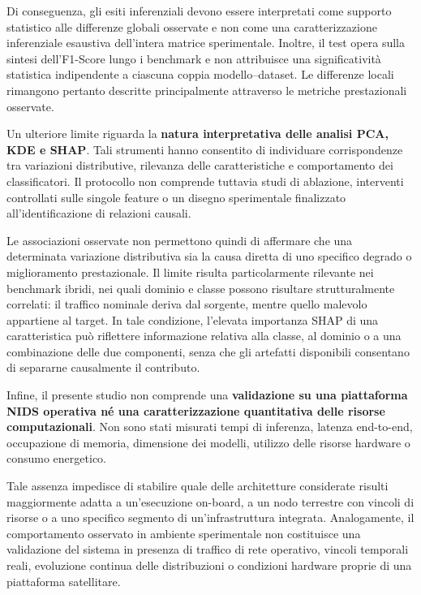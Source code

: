 Di conseguenza, gli esiti inferenziali devono essere interpretati come supporto statistico alle differenze globali osservate e non come una caratterizzazione inferenziale esaustiva dell'intera matrice sperimentale.
Inoltre, il test opera sulla sintesi dell'F1-Score lungo i benchmark e non attribuisce una significatività statistica indipendente a ciascuna coppia modello--dataset.
Le differenze locali rimangono pertanto descritte principalmente attraverso le metriche prestazionali osservate.

Un ulteriore limite riguarda la \textbf{natura interpretativa delle analisi PCA, KDE e SHAP}.
Tali strumenti hanno consentito di individuare corrispondenze tra variazioni distributive, rilevanza delle caratteristiche e comportamento dei classificatori.
Il protocollo non comprende tuttavia studi di ablazione, interventi controllati sulle singole feature o un disegno sperimentale finalizzato all'identificazione di relazioni causali.

Le associazioni osservate non permettono quindi di affermare che una determinata variazione distributiva sia la causa diretta di uno specifico degrado o miglioramento prestazionale.
Il limite risulta particolarmente rilevante nei benchmark ibridi, nei quali dominio e classe possono risultare strutturalmente correlati: il traffico nominale deriva dal sorgente, mentre quello malevolo appartiene al target.
In tale condizione, l'elevata importanza SHAP di una caratteristica può riflettere informazione relativa alla classe, al dominio o a una combinazione delle due componenti, senza che gli artefatti disponibili consentano di separarne causalmente il contributo.

Infine, il presente studio non comprende una \textbf{validazione su una piattaforma NIDS operativa né una caratterizzazione quantitativa delle risorse computazionali}.
Non sono stati misurati tempi di inferenza, latenza end-to-end, occupazione di memoria, dimensione dei modelli, utilizzo delle risorse hardware o consumo energetico.

Tale assenza impedisce di stabilire quale delle architetture considerate risulti maggiormente adatta a un'esecuzione on-board, a un nodo terrestre con vincoli di risorse o a uno specifico segmento di un'infrastruttura integrata.
Analogamente, il comportamento osservato in ambiente sperimentale non costituisce una validazione del sistema in presenza di traffico di rete operativo, vincoli temporali reali, evoluzione continua delle distribuzioni o condizioni hardware proprie di una piattaforma satellitare.

